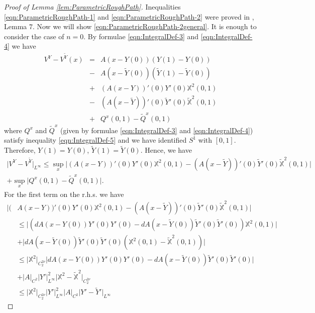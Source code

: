 \documentclass[11pt,a4paper,leqno]{amsart}%
\theoremstyle{plain}
\theoremstyle{remark}
\theoremstyle{plain}
\numberwithin{equation}{section}
\def\supl{\sup\limits}
\def\supl{\mathop{\sup}\limits}
\begin{document}
\begin{proof}[ Proof of Lemma \ref{lem:ParametricRoughPath}]
Inequalities \eqref{eqn:ParametricRoughPath-1} and
\eqref{eqn:ParametricRoughPath-2} were proved in
\cite{[Bess+Gub_2005]}, Lemma $7$. Now we will show
\eqref{eqn:ParametricRoughPath-2general}. It is enough to consider
the case of $n=0$. By formulae \eqref{eqn:IntegralDef-3} and
\eqref{eqn:IntegralDef-4} we have
\begin{eqnarray}
V^Y-V^{\tilde{Y}}(x)&=&A(x-Y(0))(Y(1)-Y(0))
\nonumber\\
&-&A(x-\tilde{Y}(0))(\tilde{Y}(1)-\tilde{Y}(0))\nonumber\\
&+&(A(x-Y))'(0)Y'(0)\mathbb{X}^2(0,1)
\nonumber\\
&-&(A(x-\tilde{Y}))'(0)\tilde{Y}'(0)\mathbb{\tilde{X}}^2(0,1)
\nonumber\\
&+&Q^x(0,1)-\tilde{Q}^x(0,1)\nonumber
\end{eqnarray}
where $Q^x$ and $\tilde{Q}^x$ (given by formulae
\eqref{eqn:IntegralDef-3} and \eqref{eqn:IntegralDef-4}) satisfy
inequality \eqref{eqn:IntegralDef-5} and we have identified $S^1$
with $[0,1]$. Therefore, $Y(1)=Y(0)$, $\tilde{Y}(1)=\tilde{Y}(0)$.
Hence, we have
\begin{multline}\label{eqn:PRaux-1}
\vert V^Y-V^{\tilde{Y}}\vert_{L^{\infty}}\leq
\supl_x\vert (A(x-Y))'(0)Y'(0)\mathbb{X}^2(0,1)-
(A(x-\tilde{Y}))'(0)\tilde{Y}'(0)\mathbb{\tilde{X}}^2(0,1)\vert \\
+\supl_x\vert Q^x(0,1)-\tilde{Q}^x(0,1)\vert .
\end{multline}
For the first term on the r.h.s. we have
\begin{align}\label{eqn:PRaux-2}
\vert (&A(x-Y))'(0)Y'(0)\mathbb{X}^2(0,1)-
(A(x-\tilde{Y}))'(0)\tilde{Y}'(0)\mathbb{\tilde{X}}^2(0,1)\vert \\
&\leq
\vert (dA(x-Y(0))Y'(0)Y'(0)-dA(x-\tilde{Y}(0))\tilde{Y}'(0)\tilde{Y}'(0))\mathbb{X}^2(0,1)\vert \nonumber\\
&+\vert dA(x-\tilde{Y}(0))\tilde{Y}'(0)\tilde{Y}'(0)(\mathbb{X}^2(0,1)-\mathbb{\tilde{X}}^2(0,1))\vert \nonumber\\
&\leq \vert \mathbb{X}^2\vert_{C_2^{2\nu}}\vert dA(x-Y(0))Y'(0)Y'(0)-dA(x-\tilde{Y}(0))\tilde{Y}'(0)\tilde{Y}'(0)\vert \nonumber\\
&+ \vert A\vert_{C^2}\vert Y'\vert_{L^{\infty}}^2\vert \mathbb{X}^2-\mathbb{\tilde{X}}^2\vert_{C_2^{2\nu}}\nonumber\\
&\leq
\vert \mathbb{X}^2\vert_{C_2^{2\nu}}\vert Y'\vert_{L^{\infty}}^2\vert A\vert_{C^2}\vert Y'-\tilde{Y}'\vert_{L^{\infty}}

\end{align}
\end{proof}
\end{document}
